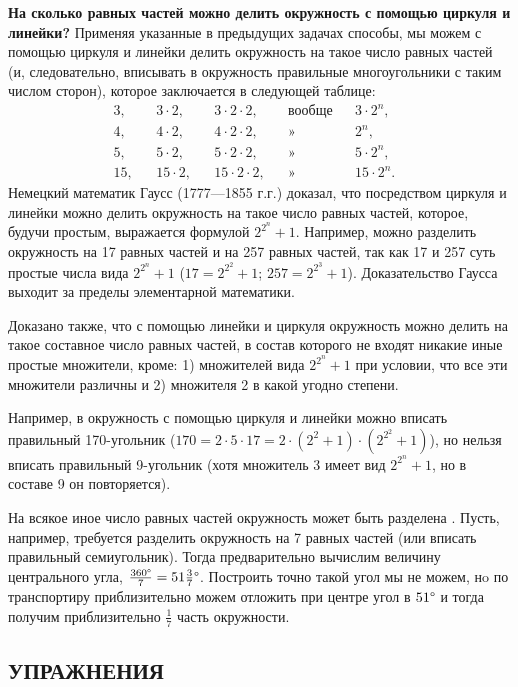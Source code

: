 \documentclass[oneside]{book}
\begin{document}
\textbf{На сколько равных частей можно делить окружность с помощью циркуля и линейки?}
Применяя указанные в предыдущих задачах способы, мы можем с помощью циркуля и линейки делить окружность на такое число равных частей (и, следовательно, вписывать в окружность правильные многоугольники с таким числом сторон), которое заключается в следующей таблице:
\begin{align*}
3,&&3\cdot 2,&&3\cdot2\cdot2,&&\text{вообще}&&3\cdot 2^n,&
\\
4,&&4\cdot 2,&&4\cdot2\cdot2,&&\text{»\ \ \ }&&2^n,&
\\
5,&&5\cdot 2,&&5\cdot2\cdot2,&&\text{»\ \ \ }&&5\cdot 2^n,&
\\
15,&&15\cdot 2,&&15\cdot2\cdot2,&&\text{»\ \ \ }&&15\cdot 2^n.&
\end{align*}
Немецкий математик Гаусс (1777---1855 г.г.) доказал, что посредством циркуля и линейки можно делить окружность на такое число равных частей, которое, будучи простым, выражается формулой $2^{2^n} + 1$.
Например, можно разделить окружность на 17 равных частей и на 257 равных частей, так как 17 и 257 суть простые числа вида $2^{2^n} + 1$ ($17 = 2^{2^2} + 1$;
$257 = 2^{2^3} + 1$).
Доказательство Гаусса выходит за пределы элементарной математики.

Доказано также, что с помощью линейки и циркуля окружность можно делить на такое составное число равных частей, в состав которого не входят никакие иные простые множители, кроме:
1) множителей вида $2^{2^n} + 1$ при условии, что все эти множители различны 
и 
2) множителя 2 в какой угодно степени.

Например, в окружность с помощью циркуля и линейки можно вписать правильный 170-угольник ($170 = 2 \cdot 5 \cdot 17 = 2 \cdot (2^2 + 1) \cdot (2^{2^2} +1)$),
но нельзя вписать правильный 9-угольник (хотя множитель 3 имеет вид $2^{2^n} + 1$, но в составе 9 он повторяется).

На всякое иное число равных частей окружность может быть разделена .
Пусть, например, требуется разделить окружность на 7 равных частей (или вписать правильный семиугольник).
Тогда предварительно вычислим величину центрального угла,
$\frac{360\degree}7=51\tfrac37\degree$.
Построить точно такой угол мы не можем, нo по транспортиру приблизительно можем отложить при центре угол в $51\degree$ и тогда получим приблизительно $\tfrac17$ часть окружности.

\subsection*{УПРАЖНЕНИЯ}
\end{document}
